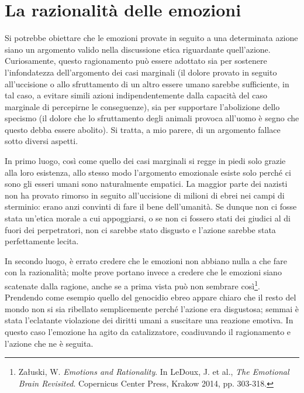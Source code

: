 \documentclass[a4paper,11pt,oneside,article]{memoir}
\begin{document}
\section{La razionalità delle emozioni}

Si potrebbe obiettare che le emozioni provate in seguito a una determinata
azione siano un argomento valido nella discussione etica riguardante
quell'azione. Curiosamente, questo ragionamento può essere adottato sia per
sostenere l'infondatezza dell'argomento dei casi marginali (il dolore provato in
seguito all'uccisione o allo sfruttamento di un altro essere umano sarebbe
sufficiente, in tal caso, a evitare simili azioni indipendentemente dalla
capacità del caso marginale di percepirne le conseguenze), sia per supportare
l'abolizione dello specismo (il dolore che lo sfruttamento degli animali provoca
all'uomo è segno che questo debba essere abolito). Si tratta, a mio parere, di
un argomento fallace sotto diversi aspetti.

In primo luogo, così come quello dei casi marginali si regge in piedi solo
grazie alla loro esistenza, allo stesso modo l'argomento emozionale esiste solo
perché ci sono gli esseri umani sono naturalmente empatici. La maggior parte dei
nazisti non ha provato rimorso in seguito all'uccisione di milioni di ebrei nei
campi di sterminio: erano anzi convinti di fare il bene dell'umanità. Se dunque
non ci fosse stata un'etica morale a cui appoggiarsi, o se non ci fossero stati
dei giudici al di fuori dei perpetratori, non ci sarebbe stato disgusto e
l'azione sarebbe stata perfettamente lecita.

In secondo luogo, è errato credere che le emozioni non abbiano nulla a che fare
con la razionalità; molte prove portano invece a credere che le emozioni siano
scatenate dalla ragione, anche se a prima vista può non sembrare
così\footnote{Załuski, W. \emph{Emotions and Rationality}. In LeDoux, J. et al.,
\emph{The Emotional Brain Revisited}. Copernicus Center Press, Krakow 2014, pp.
303-318.}. Prendendo come esempio quello del genocidio ebreo appare chiaro che
il resto del mondo non si sia ribellato semplicemente perché l'azione era
disgustosa; semmai è stata l'eclatante violazione dei diritti umani a suscitare
una reazione emotiva. In questo caso l'emozione ha agito da catalizzatore,
coadiuvando il ragionamento e l'azione che ne è seguita.
\end{document}
